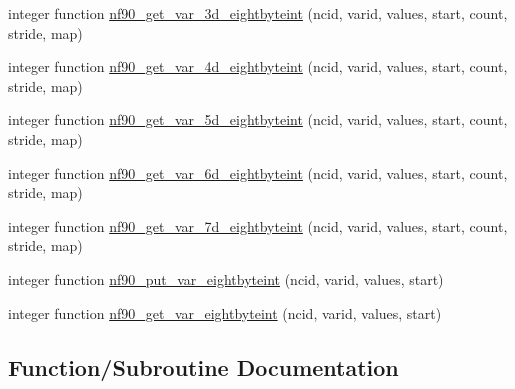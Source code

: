\begin{DoxyCompactItemize}
\item 
integer function \hyperlink{netcdf4__eightbyte_8f90_a8fa455e882db95833737abdb421cf413}{nf90\+\_\+get\+\_\+var\+\_\+3d\+\_\+eightbyteint} (ncid, varid, values, start, count, stride, map)
\item 
integer function \hyperlink{netcdf4__eightbyte_8f90_a13a8c596ce2cddbdd93d52adba8ed05f}{nf90\+\_\+get\+\_\+var\+\_\+4d\+\_\+eightbyteint} (ncid, varid, values, start, count, stride, map)
\item 
integer function \hyperlink{netcdf4__eightbyte_8f90_aad2961aebfb639255928956049693640}{nf90\+\_\+get\+\_\+var\+\_\+5d\+\_\+eightbyteint} (ncid, varid, values, start, count, stride, map)
\item 
integer function \hyperlink{netcdf4__eightbyte_8f90_a98c01b59edd61dfa5608ab76dbac07ef}{nf90\+\_\+get\+\_\+var\+\_\+6d\+\_\+eightbyteint} (ncid, varid, values, start, count, stride, map)
\item 
integer function \hyperlink{netcdf4__eightbyte_8f90_aa72f717e4c1e4bba1378e0c40c310ce3}{nf90\+\_\+get\+\_\+var\+\_\+7d\+\_\+eightbyteint} (ncid, varid, values, start, count, stride, map)
\item 
integer function \hyperlink{netcdf4__eightbyte_8f90_a19465ca23067ad30103744429fb4bb95}{nf90\+\_\+put\+\_\+var\+\_\+eightbyteint} (ncid, varid, values, start)
\item 
integer function \hyperlink{netcdf4__eightbyte_8f90_acdfad8c826daa4962a18f239a1495bf3}{nf90\+\_\+get\+\_\+var\+\_\+eightbyteint} (ncid, varid, values, start)
\end{DoxyCompactItemize}


\subsection{Function/\+Subroutine Documentation}
\mbox{\label{netcdf4__eightbyte_8f90_ac7f1c7b59c40bf98465096bf2de86167}} 
